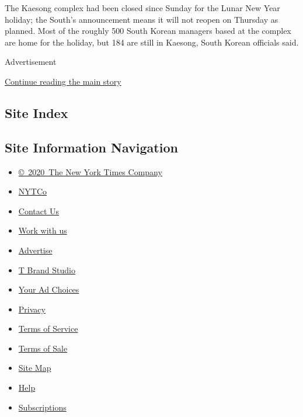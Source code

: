 The Kaesong complex had been closed since Sunday for the Lunar New Year
holiday; the South's announcement means it will not reopen on Thursday
as planned. Most of the roughly 500 South Korean managers based at the
complex are home for the holiday, but 184 are still in Kaesong, South
Korean officials said.

Advertisement

\protect\hyperlink{after-bottom}{Continue reading the main story}

\hypertarget{site-index}{%
\subsection{Site Index}\label{site-index}}

\hypertarget{site-information-navigation}{%
\subsection{Site Information
Navigation}\label{site-information-navigation}}

\begin{itemize}
\tightlist
\item
  \href{https://help.nytimes.com/hc/en-us/articles/115014792127-Copyright-notice}{©~2020~The
  New York Times Company}
\end{itemize}

\begin{itemize}
\tightlist
\item
  \href{https://www.nytco.com/}{NYTCo}
\item
  \href{https://help.nytimes.com/hc/en-us/articles/115015385887-Contact-Us}{Contact
  Us}
\item
  \href{https://www.nytco.com/careers/}{Work with us}
\item
  \href{https://nytmediakit.com/}{Advertise}
\item
  \href{http://www.tbrandstudio.com/}{T Brand Studio}
\item
  \href{https://www.nytimes.com/privacy/cookie-policy\#how-do-i-manage-trackers}{Your
  Ad Choices}
\item
  \href{https://www.nytimes.com/privacy}{Privacy}
\item
  \href{https://help.nytimes.com/hc/en-us/articles/115014893428-Terms-of-service}{Terms
  of Service}
\item
  \href{https://help.nytimes.com/hc/en-us/articles/115014893968-Terms-of-sale}{Terms
  of Sale}
\item
  \href{https://spiderbites.nytimes.com}{Site Map}
\item
  \href{https://help.nytimes.com/hc/en-us}{Help}
\item
  \href{https://www.nytimes.com/subscription?campaignId=37WXW}{Subscriptions}
\end{itemize}
